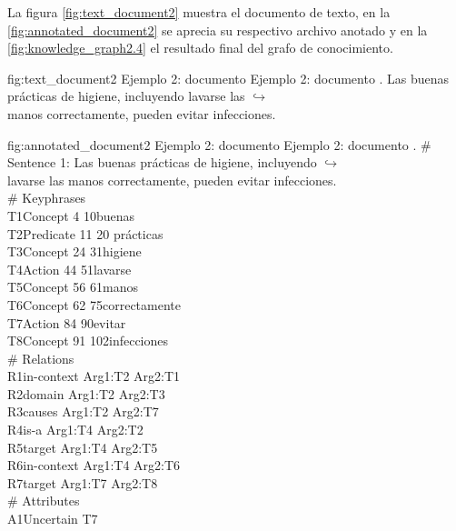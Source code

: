 La figura \ref{fig:text_document2} muestra el documento de texto, en la \ref{fig:annotated_document2} se aprecia su respectivo archivo anotado y en la \ref{fig:knowledge_graph2.4} el resultado final del grafo de conocimiento.

\begin{annexample}
[backgroundcolor=black!5]
{\textwidth}
{fig:text_document2}
{Ejemplo 2: documento }
{Ejemplo 2: documento .}
	Las buenas prácticas de higiene, incluyendo lavarse las {\scriptsize $\hookrightarrow$}\\
	manos correctamente, pueden evitar infecciones.
\end{annexample}

\begin{annexample}
[backgroundcolor=cyan!13]
{\textwidth}
{fig:annotated_document2}
{Ejemplo 2: documento }
{Ejemplo 2: documento .}
	\# Sentence 1: Las buenas prácticas de higiene, incluyendo {\scriptsize $\hookrightarrow$}\\
	lavarse las manos correctamente, pueden evitar infecciones.\\
	\# Keyphrases\\
	T1\space\space Concept 4 10\space\space\space\space buenas\\
	T2\space\space Predicate 11 20 prácticas\\
	T3\space\space Concept 24 31\space\space\space higiene\\
	T4\space\space Action 44 51\space\space\space\space lavarse\\
	T5\space\space Concept 56 61\space\space\space manos\\
	T6\space\space Concept 62 75\space\space\space correctamente\\
	T7\space\space Action 84 90\space\space\space\space evitar\\
	T8\space\space Concept 91 102\space\space infecciones\\
	\# Relations\\
	R1\space\space in-context Arg1:T2 Arg2:T1\\
	R2\space\space domain Arg1:T2 Arg2:T3\\
	R3\space\space causes Arg1:T2 Arg2:T7\\
	R4\space\space is-a Arg1:T4 Arg2:T2\\
	R5\space\space target Arg1:T4 Arg2:T5\\
	R6\space\space in-context Arg1:T4 Arg2:T6\\
	R7\space\space target Arg1:T7 Arg2:T8\\
	\# Attributes\\
	A1\space\space Uncertain T7
\end{annexample}

